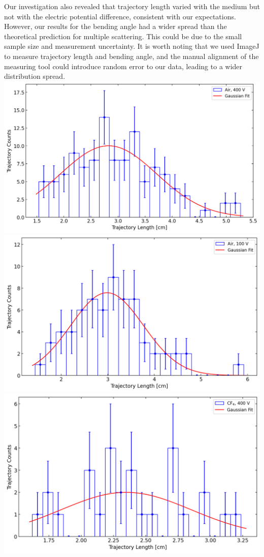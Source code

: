 \documentclass[a4paper]{tufte-handout}
\begin{document}
Our investigation also revealed that trajectory length varied with the medium but not with the electric potential difference, consistent with our expectations. However, our results for the bending angle had a wider spread than the theoretical prediction for multiple scattering. This could be due to the small sample size and measurement uncertainty. It is worth noting that we used ImageJ to measure trajectory length and bending angle, and the manual alignment of the measuring tool could introduce random error to our data, leading to a wider distribution spread.
\\
\includegraphics[width = 1\textwidth]{figures/result_air400.png}
\\
\includegraphics[width = 1\textwidth]{figures/result_air100.png}
\\
\includegraphics[width = 1\textwidth]{figures/result_cf4400.png}
\end{document}
